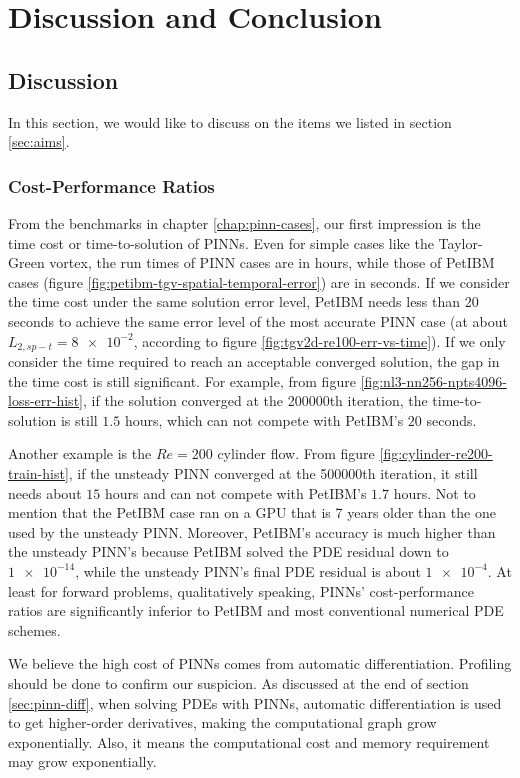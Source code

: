 \chapter{Discussion and Conclusion}\label{chap:discussion}

\section{Discussion}

In this section, we would like to discuss on the items we listed in section \ref{sec:aims}.

\subsection*{Cost-Performance Ratios}

From the benchmarks in chapter \ref{chap:pinn-cases}, our first impression is the time cost or time-to-solution of PINNs.
Even for simple cases like the Taylor-Green vortex, the run times of PINN cases are in hours, while those of PetIBM cases (figure \ref{fig:petibm-tgv-spatial-temporal-error}) are in seconds.
If we consider the time cost under the same solution error level, PetIBM needs less than 20 seconds to achieve the same error level of the most accurate PINN case (at about $L_{2,sp-t}=\num{8e-2}$, according to figure \ref{fig:tgv2d-re100-err-vs-time}).
If we only consider the time required to reach an acceptable converged solution, the gap in the time cost is still significant.
For example, from figure \ref{fig:nl3-nn256-npts4096-loss-err-hist}, if the solution converged at the \num{200000}th iteration, the time-to-solution is still $1.5$ hours, which can not compete with PetIBM's $20$ seconds.

Another example is the $Re=200$ cylinder flow.
From figure \ref{fig:cylinder-re200-train-hist}, if the unsteady PINN converged at the \num{500000}th iteration, it still needs about $15$ hours and can not compete with PetIBM's $1.7$ hours.
Not to mention that the PetIBM case ran on a GPU that is 7 years older than the one used by the unsteady PINN.
Moreover, PetIBM's accuracy is much higher than the unsteady PINN's because PetIBM solved the PDE residual down to $\num{1e-14}$, while the unsteady PINN's final PDE residual is about $\num{1e-4}$.
At least for forward problems, qualitatively speaking, PINNs' cost-performance ratios are significantly inferior to PetIBM and most conventional numerical PDE schemes.

We believe the high cost of PINNs comes from automatic differentiation.
Profiling should be done to confirm our suspicion.
As discussed at the end of section \ref{sec:pinn-diff}, when solving PDEs with PINNs, automatic differentiation is used to get higher-order derivatives, making the computational graph grow exponentially.
Also, it means the computational cost and memory requirement may grow exponentially.

